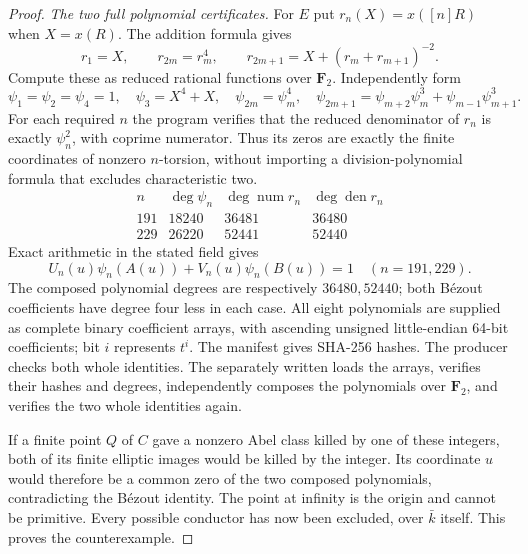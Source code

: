 \documentclass[11pt,a4paper]{article}
\begin{document}
\begin{proof}
\emph{The two full polynomial certificates.}
For $E$ put $r_n(X)=x([n]R)$ when $X=x(R)$. The addition formula gives
\[
 r_1=X,\qquad r_{2m}=r_m^4,\qquad
 r_{2m+1}=X+(r_m+r_{m+1})^{-2}.
\]
Compute these as reduced rational functions over $\mathbf F_2$.
Independently form
\[
 \psi_1=\psi_2=\psi_4=1,\quad\psi_3=X^4+X,\quad
 \psi_{2m}=\psi_m^4,\quad
 \psi_{2m+1}=\psi_{m+2}\psi_m^3+\psi_{m-1}\psi_{m+1}^3.
\]
For each required $n$ the program verifies that the reduced
denominator of $r_n$ is exactly $\psi_n^2$, with coprime numerator.
Thus its zeros are exactly the finite coordinates of nonzero
$n$-torsion, without importing a division-polynomial formula
that excludes characteristic two.
\[
\begin{array}{c|r|r|r}
 n&\deg\psi_n&\deg\operatorname{num}r_n&
                  \deg\operatorname{den}r_n\\ \hline
191&18240&36481&36480\\
229&26220&52441&52440
\end{array}
\]
Exact arithmetic in the stated field gives
\[
 U_n(u)\psi_n(A(u))+V_n(u)\psi_n(B(u))=1
                    \quad(n=191,229).
\]
The composed polynomial degrees are respectively $36480,52440$;
both B\'ezout coefficients have degree four less in each case.
All eight polynomials are supplied as complete binary coefficient
arrays, with ascending unsigned little-endian 64-bit coefficients;
bit $i$ represents $t^i$. The manifest gives SHA-256 hashes.
The producer checks both whole identities. The separately written
 loads the arrays, verifies their
hashes and degrees, independently composes the polynomials over
$\mathbf F_2$, and verifies the two whole identities again.

If a finite point $Q$ of $C$ gave a nonzero Abel class killed by
one of these integers, both of its finite elliptic images would
be killed by the integer. Its coordinate $u$ would therefore be a
common zero of the two composed polynomials, contradicting the
B\'ezout identity. The point at infinity is the origin and cannot
be primitive. Every possible conductor has now been excluded,
over $\bar k$ itself. This proves the counterexample.
\end{proof}
\end{document}

